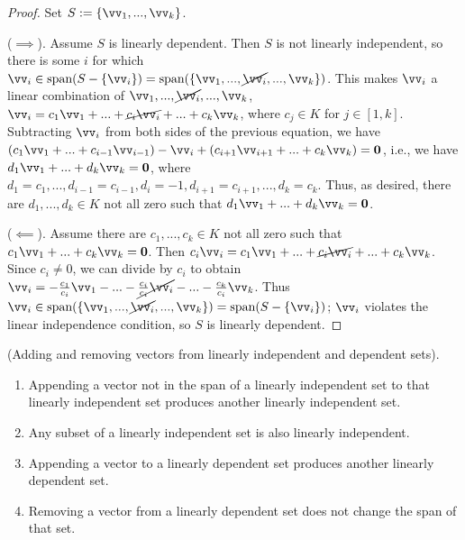 \begin{proof}
    Set $S := \{\vv_1, ..., \vv_k\}$.
    
   ($\implies$). Assume $S$ is linearly dependent. Then $S$ is not linearly independent, so there is some $i$ for which ${\vv_i \in \spann(S - \{\vv_i\})} = \spann(\{\vv_1, ..., \cancel{\vv_i}, ..., \vv_k\})$. This makes $\vv_i$ a linear combination of $\vv_1, ..., \cancel{\vv_i}, ..., \vv_k$, ${\vv_i = c_1 \vv_1 + ... + \cancel{c_i \vv_i} + ... + c_k \vv_k}$, where $c_j \in K$ for $j \in [1, k]$. Subtracting $\vv_i$ from both sides of the previous equation, we have ${(c_1 \vv_1 + ... + c_{i - 1} \vv_{i - 1}) - \vv_i + (c_{i + 1} \vv_{i + 1} + ... + c_k \vv_k) = \mathbf{0}}$, i.e., we have ${d_1 \vv_1 + ... + d_k \vv_k = \mathbf{0}}$, where $d_1 = c_1, ..., d_{i - 1} = c_{i - 1}, d_i = -1, d_{i + 1} = c_{i + 1}, ..., d_k = c_k$. Thus, as desired, there are $d_1, ..., d_k \in K$ not all zero such that $d_1 \vv_1 + ... + d_k \vv_k = \mathbf{0}$.
   
   ($\impliedby$). Assume there are $c_1, ..., c_k \in K$ not all zero such that $c_1 \vv_1 + ... + c_k \vv_k = \mathbf{0}$. Then $c_i \vv_i = c_1 \vv_1 + ... + \cancel{c_i \vv_i} + ... + c_k \vv_k$. Since $c_i \neq 0$, we can divide by $c_i$ to obtain $\vv_i = -\frac{c_1}{c_i} \vv_1 - ... - \cancel{\frac{c_i}{c_i}\vv_i} - ... - \frac{c_k}{c_i}\vv_k$. Thus $\vv_i \in \spann(\{\vv_1, ..., \cancel{\vv_i}, ..., \vv_k\}) = \spann(S - \{\vv_i\})$; $\vv_i$ violates the linear independence condition, so $S$ is linearly dependent.
\end{proof}

\begin{lemma}
    \label{ch::lin_alg::lemma::adding_removing_vectors_li_ld_sets}
    (Adding and removing vectors from linearly independent and dependent sets).

    \begin{enumerate}
        \item Appending a vector not in the span of a linearly independent set to that linearly independent set produces another linearly independent set.
        \item Any subset of a linearly independent set is also linearly independent.
        \item Appending a vector to a linearly dependent set produces another linearly dependent set.
        \item Removing a vector from a linearly dependent set does not change the span of that set.
    \end{enumerate}
\end{lemma}

